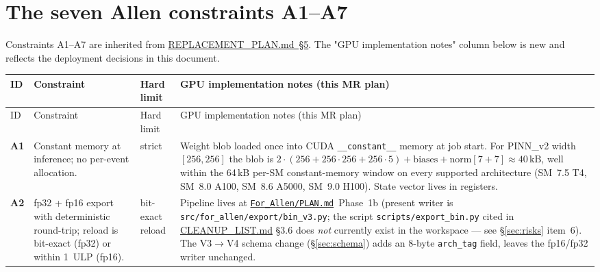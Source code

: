 \documentclass[11pt,a4paper]{article}
\providecommand{\SI}[2]{#1\,\ensuremath{\mathrm{#2}}}
\newcommand{\code}[1]{\texttt{#1}}
\begin{document}
\section{The seven Allen constraints A1--A7}
\label{sec:constraints}

Constraints A1--A7 are inherited from
\href{run:../../experiments/gen_3/REPLACEMENT_PLAN.md}{REPLACEMENT\_PLAN.md~\S5}.
The "GPU implementation notes" column below is new and reflects the
deployment decisions in this document.

\begin{longtable}{p{} p{} p{} p{}}
\toprule
ID & Constraint & Hard limit & GPU implementation notes (this MR plan) \\
\midrule
\endfirsthead
\toprule
ID & Constraint & Hard limit & GPU implementation notes (this MR plan) \\
\midrule
\endhead

\textbf{A1} & Constant memory at inference; no per-event allocation. &
strict &
Weight blob loaded once into CUDA \code{\_\_constant\_\_} memory at job
start. For PINN\_v2 width $[256,256]$ the blob is
$2 \!\cdot\! (256{+}256{\cdot}256{+}256{\cdot}5) + \text{biases} +
\text{norm}[7{+}7]\!\approx\!\SI{40}{kB}$, well within the 64\,kB
per-SM constant-memory window on every supported architecture
(SM~7.5 T4, SM~8.0 A100, SM~8.6 A5000, SM~9.0 H100). State vector lives
in registers. \\
\midrule

\textbf{A2} & fp32 + fp16 export with deterministic round-trip; reload is
bit-exact (fp32) or within 1~ULP (fp16). &
bit-exact reload &
Pipeline lives at
\href{run:../../experiments/gen_3/For_Allen/PLAN.md}{\code{For\_Allen/PLAN.md}}~Phase~1b
(present writer is \code{src/for\_allen/export/bin\_v3.py}; the script
\code{scripts/export\_bin.py} cited in
\href{run:../../experiments/gen_3/CLEANUP_LIST.md}{CLEANUP\_LIST.md} \S3.6
does \emph{not} currently exist in the workspace --- see
\S\ref{sec:risks} item~6). The V3$\to$V4 schema change (\S\ref{sec:schema})
adds an 8-byte \code{arch\_tag} field, leaves the fp16/fp32 writer
unchanged.\\
\midrule


\end{longtable}
\end{document}
